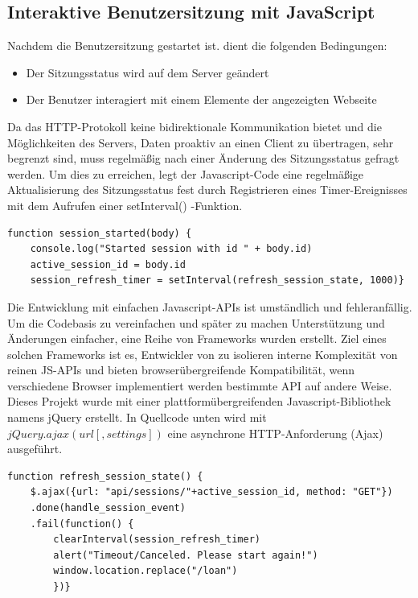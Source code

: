 \subsection{Interaktive Benutzersitzung mit JavaScript}
\label{sec:display_client:session}
Nachdem die Benutzersitzung gestartet ist. dient die folgenden Bedingungen:
\begin{itemize}
	\item Der Sitzungsstatus wird auf dem Server geändert
	\item Der Benutzer interagiert mit einem Elemente der angezeigten Webseite
\end{itemize}
Da das HTTP-Protokoll keine bidirektionale Kommunikation bietet und die Möglichkeiten des Servers, Daten proaktiv an einen Client zu übertragen, sehr begrenzt sind, muss regelmäßig nach einer Änderung des Sitzungsstatus gefragt werden. Um dies zu erreichen, legt der Javascript-Code eine regelmäßige Aktualisierung des Sitzungsstatus fest durch Registrieren eines Timer-Ereignisses mit dem Aufrufen einer setInterval() -Funktion. 
\begin{lstlisting}[caption={function session\_started()},captionpos=b]
function session_started(body) {
	console.log("Started session with id " + body.id)
	active_session_id = body.id
	session_refresh_timer = setInterval(refresh_session_state, 1000)}
\end{lstlisting}
Die Entwicklung mit einfachen Javascript-APIs ist umständlich und fehleranfällig. Um die Codebasis zu vereinfachen und später zu machen Unterstützung und Änderungen einfacher, eine Reihe von Frameworks wurden erstellt. Ziel eines solchen Frameworks ist es, Entwickler von zu isolieren
interne Komplexität von reinen JS-APIs und bieten browserübergreifende Kompatibilität, wenn verschiedene Browser implementiert werden bestimmte API auf andere Weise. Dieses Projekt wurde mit einer plattformübergreifenden Javascript-Bibliothek namens jQuery erstellt. In Quellcode unten wird mit $jQuery.ajax( url [, settings ] )$ eine asynchrone HTTP-Anforderung (Ajax) ausgeführt. 
\begin{lstlisting}[caption={Function refresh\_session\_state()},captionpos=b]
function refresh_session_state() {
	$.ajax({url: "api/sessions/"+active_session_id, method: "GET"})
	.done(handle_session_event)
	.fail(function() {
		clearInterval(session_refresh_timer)
		alert("Timeout/Canceled. Please start again!")
		window.location.replace("/loan")
		})}
\end{lstlisting}

